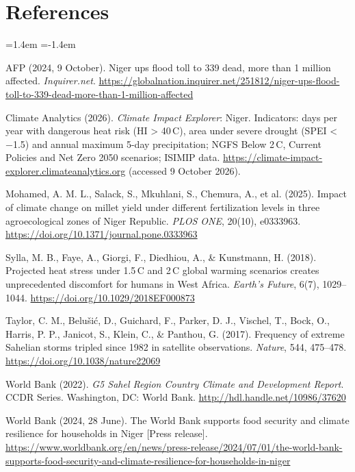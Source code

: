 \documentclass[12pt,a4paper]{article}
\newcommand{\degC}{\,\textdegree C}
\begin{document}
\clearpage
\section{References}
{\singlespacing
\begin{list}{}{\leftmargin=1.4em \itemindent=-1.4em \itemsep=5pt \parsep=0pt}
\item AFP (2024, 9 October). Niger ups flood toll to 339 dead, more than 1 million affected.
      \emph{Inquirer.net}.
      \url{https://globalnation.inquirer.net/251812/niger-ups-flood-toll-to-339-dead-more-than-1-million-affected}
\item Climate Analytics (2026). \emph{Climate Impact Explorer}: Niger. Indicators: days per year with
      dangerous heat risk (HI > 40\degC), area under severe drought (SPEI < −1.5) and annual maximum 5-day
      precipitation; NGFS Below 2\degC, Current Policies and Net Zero 2050 scenarios; ISIMIP data.
      \url{https://climate-impact-explorer.climateanalytics.org} (accessed 9 October 2026).
\item Mohamed, A. M. L., Salack, S., Mkuhlani, S., Chemura, A., et al. (2025). Impact of climate change on
      millet yield under different fertilization levels in three agroecological zones of Niger Republic.
      \emph{PLOS ONE}, 20(10), e0333963. \url{https://doi.org/10.1371/journal.pone.0333963}
\item Sylla, M. B., Faye, A., Giorgi, F., Diedhiou, A., \& Kunstmann, H. (2018). Projected heat stress under
      1.5\degC{} and 2\degC{} global warming scenarios creates unprecedented discomfort for humans in West
      Africa. \emph{Earth's Future}, 6(7), 1029--1044. \url{https://doi.org/10.1029/2018EF000873}
\item Taylor, C. M., Belu\v{s}i\'{c}, D., Guichard, F., Parker, D. J., Vischel, T., Bock, O., Harris, P. P.,
      Janicot, S., Klein, C., \& Panthou, G. (2017). Frequency of extreme Sahelian storms tripled since 1982 in
      satellite observations. \emph{Nature}, 544, 475--478. \url{https://doi.org/10.1038/nature22069}
\item World Bank (2022). \emph{G5 Sahel Region Country Climate and Development Report}. CCDR Series.
      Washington, DC: World Bank. \url{http://hdl.handle.net/10986/37620}
\item World Bank (2024, 28 June). The World Bank supports food security and climate resilience for households
      in Niger [Press release].
      \url{https://www.worldbank.org/en/news/press-release/2024/07/01/the-world-bank-supports-food-security-and-climate-resilience-for-households-in-niger}
\end{list}}
\end{document}
